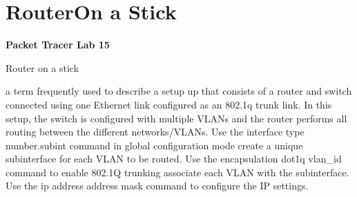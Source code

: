 \documentclass[../EngineeringJournal_CDavis.tex]{subfiles}
\begin{document}

\chapter[Router on a Stick]{Router\linebreak[1] On a Stick \hspace*{\fill March
8, 2020}}
\noindent\textbf{{Packet Tracer Lab 15} }                             


\hspace{0.2cm}
\begin{tcolorbox}[width=6.3in]
Router on a stick
\scriptsize 
  \begin{outline}
    \1 a term frequently used to describe a setup up that consists of a router and switch connected using one Ethernet link configured as an 802.1q trunk link. 
    \1 In this setup, the switch is configured with multiple VLANs and the router performs all routing between the different networks/VLANs.
    \1 Use the interface type number.subint command in global configuration mode
      \2 create a unique subinterface for each VLAN to be routed.
    \1 Use the encapsulation dot1q vlan\_id command to enable 802.1Q trunking 
      \2 associate each VLAN with the subinterface.
    \1 Use the ip address address mask command to configure the IP settings.
  \end{outline}
\hspace{0.2cm}
\end{tcolorbox}
\normalsize  
\end{document}
